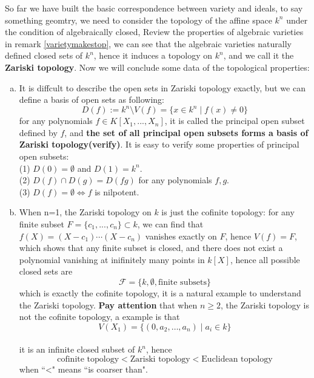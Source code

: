 \documentclass[12pt,a4paper]{article}
\begin{document}
So far we have built the basic correspondence between variety and ideals, to say something geomtry, we need to consider the topology of the affine space \(k^n\) under the condition of algebraically closed, Review the properties of algebraic varieties in remark \ref{varietymakestop}, we can see that the algebraic varieties naturally defined closed sets of \(k^n\), hence it induces a topology on \(k^n\), and we call it the \textbf{Zariski topology}. Now we will conclude some data of the topological properties:

\begin{enumerate}[(a)]
    \item It is diffcult to describe the open sets in Zariski topology exactly, but we can define a basis of open sets as following:
    \[D(f) := k^n \setminus V(f) = \{x \in k^n \mid f(x) \neq 0\}\]
    for any polynomials \(f \in K[X_1,...,X_n]\), it is called the principal open subset defined by \(f\), and \textbf{the set of all principal open subsets forms a basis of Zariski topology(verify)}. It is easy to verify some properties of principal open subsets:\\
    (1) \(D(0) = \emptyset\) and \(D(1) = k^n\).\\
    (2) \(D(f) \cap D(g) = D(fg)\) for any polynomials \(f,g\).\\
    (3) \(D(f) = \emptyset \iff f\) is nilpotent.\\

    \item When n=1, the Zariski topology on \(k\) is just the cofinite topology: for any finite subset \(F = \{c_1,...,c_n\}\subset k\), we can find that \(f(X) = (X-c_1)\cdots(X-c_n)\) vanishes exactly on \(F\), hence \(V(f) = F\), which shows that any finite subset is closed, and there does not exist a polynomial vanishing at inifinitely many points in \(k[X]\), hence all possible closed sets are
    \[\mathcal{F} = \{k,\emptyset,\text{finite subsets}\}\]
    which is exactly the cofinite topology, it is a natural example to understand the Zariski topology. \textbf{Pay attention} that when \(n\geq 2\), the Zariski topology is not the cofinite topology, a example is that 
    \[V(X_1) = \{(0,a_2,\dots,a_n) \mid a_i \in k\}\]\\
    it is an infinite closed subset of \(k^n\), hence 
    \[\text{cofinite topology} < \text{Zariski topology} < \text{Euclidean topology}\]
    when “<" means “is coarser than".\\


\end{enumerate}
\end{document}
